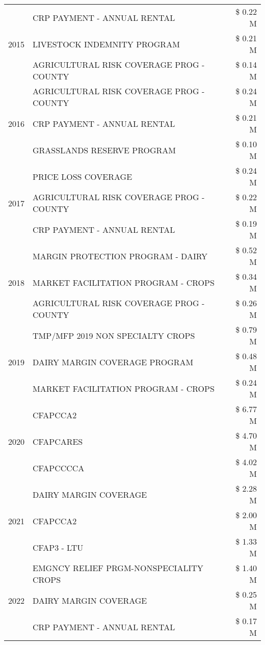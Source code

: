 \begin{tabular}{llr}
\cline{1-3}
\multirow[t]{3}{*}{2015} & CRP PAYMENT - ANNUAL RENTAL & \$ 0.22 M \\
 & LIVESTOCK INDEMNITY PROGRAM & \$ 0.21 M \\
 & AGRICULTURAL RISK COVERAGE PROG - COUNTY & \$ 0.14 M \\
\cline{1-3}
\multirow[t]{3}{*}{2016} & AGRICULTURAL RISK COVERAGE PROG - COUNTY & \$ 0.24 M \\
 & CRP PAYMENT - ANNUAL RENTAL & \$ 0.21 M \\
 & GRASSLANDS RESERVE PROGRAM & \$ 0.10 M \\
\cline{1-3}
\multirow[t]{3}{*}{2017} & PRICE LOSS COVERAGE & \$ 0.24 M \\
 & AGRICULTURAL RISK COVERAGE PROG - COUNTY & \$ 0.22 M \\
 & CRP PAYMENT - ANNUAL RENTAL & \$ 0.19 M \\
\cline{1-3}
\multirow[t]{3}{*}{2018} & MARGIN PROTECTION PROGRAM - DAIRY & \$ 0.52 M \\
 & MARKET FACILITATION PROGRAM - CROPS & \$ 0.34 M \\
 & AGRICULTURAL RISK COVERAGE PROG - COUNTY & \$ 0.26 M \\
\cline{1-3}
\multirow[t]{3}{*}{2019} & TMP/MFP 2019 NON SPECIALTY CROPS & \$ 0.79 M \\
 & DAIRY MARGIN COVERAGE PROGRAM & \$ 0.48 M \\
 & MARKET FACILITATION PROGRAM - CROPS & \$ 0.24 M \\
\cline{1-3}
\multirow[t]{3}{*}{2020} & CFAPCCA2 & \$ 6.77 M \\
 & CFAPCARES & \$ 4.70 M \\
 & CFAPCCCCA & \$ 4.02 M \\
\cline{1-3}
\multirow[t]{3}{*}{2021} & DAIRY MARGIN COVERAGE & \$ 2.28 M \\
 & CFAPCCA2 & \$ 2.00 M \\
 & CFAP3 - LTU & \$ 1.33 M \\
\cline{1-3}
\multirow[t]{3}{*}{2022} & EMGNCY RELIEF PRGM-NONSPECIALITY CROPS & \$ 1.40 M \\
 & DAIRY MARGIN COVERAGE & \$ 0.25 M \\
 & CRP PAYMENT - ANNUAL RENTAL & \$ 0.17 M \\
\cline{1-3}
\bottomrule
\end{tabular}
